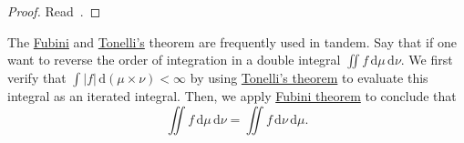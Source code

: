 \begin{proof}
	Read~\cite{folland1999real}.
\end{proof}
\begin{remark}
	The \hyperref[thm:Fubini-theorem]{Fubini} and \hyperref[thm:Tonelli-theorem]{Tonelli's} theorem are frequently used in tandem. Say that if one want to reverse the order of integration in a double integral
	\(\iint f \,\mathrm{d} \mu \,\mathrm{d} \nu \). We first verify that \(\int \left\vert f \right\vert \,\mathrm{d} (\mu \times \nu ) < \infty \) by using
	\hyperref[thm:Tonelli-theorem]{Tonelli's theorem} to evaluate this integral as an iterated integral. Then, we apply \hyperref[thm:Fubini-theorem]{Fubini theorem}
	to conclude that
	\[
		\iint f \,\mathrm{d} \mu \,\mathrm{d} \nu = \iint f \,\mathrm{d} \nu \,\mathrm{d} \mu.
	\]
\end{remark}
